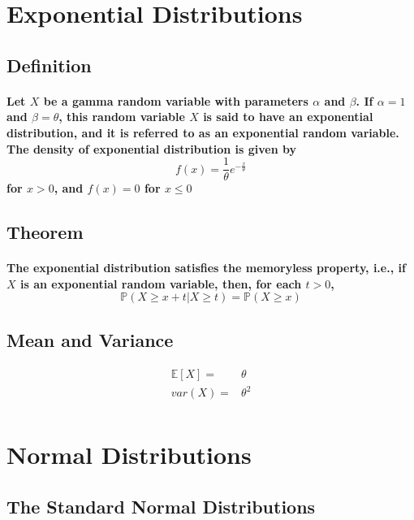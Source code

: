 \documentclass[titlepage]{article}
\begin{document}
    \section{Exponential Distributions}
        \subsection*{Definition}
            \paragraph{
                Let $X$ be a gamma random variable with parameters $\alpha$ and $\beta$. If $\alpha=1$ and $\beta=\theta$, this random variable $X$ is said to have an exponential distribution, and it is referred to as an exponential random variable. The density of exponential distribution is given by 
                $$f(x)=\frac{1}{\theta}e^{-\frac{x}{\theta}}$$
                for $x>0$, and $f(x)=0$ for $x\leq 0$
            }
        \subsection*{Theorem}
            \paragraph{
                The exponential distribution satisfies the memoryless property, i.e., if $X$ is an exponential random variable, then, for each $t>0$,
                $$\mathbb{P}(X\geq x+t|X\geq t)=\mathbb{P}(X\geq x)$$
            }
        \subsection*{Mean and Variance}
            \begin{equation*}
                \begin{split}
                    \mathbb{E}[X]=&\theta\\
                    var(X)=&\theta^2\\
                \end{split}
            \end{equation*}
    \section{Normal Distributions}
        \subsection{The Standard Normal Distributions}
\end{document}
